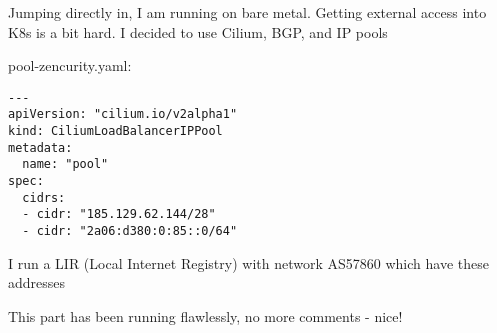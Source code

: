 \documentclass[Screen16to9,17pt]{foils}
\begin{document}

Jumping directly in, I am running on bare metal. Getting external access into K8s is a bit hard. I decided to use Cilium, BGP, and IP pools

pool-zencurity.yaml:
\begin{verbatim}
---
apiVersion: "cilium.io/v2alpha1"
kind: CiliumLoadBalancerIPPool
metadata:
  name: "pool"
spec:
  cidrs:
  - cidr: "185.129.62.144/28"
  - cidr: "2a06:d380:0:85::0/64"
\end{verbatim}

\begin{list2}
\item {}
\item I run a LIR (Local Internet Registry) with network AS57860 which have these addresses
\item This part has been running flawlessly, no more comments - nice!
\end{list2}



\end{document}
